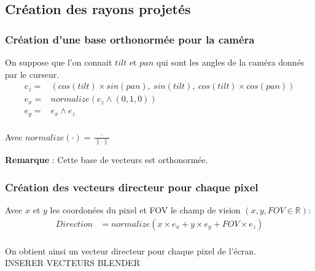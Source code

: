 \subsection{Création des rayons projetés}
\subsubsection{Création d'une base orthonormée pour la caméra}

On suppose que l'on connait $tilt$ et $pan$ qui sont les angles de la caméra donnés par le curseur. 
\begin{align*}
    e_z =&  (cos(tilt)\times sin(pan) ,\ sin(tilt) ,\ cos(tilt)\times cos(pan))\\
    e_x =&  normalize(e_z \wedge (0,1,0) )\\
    e_y =& e_x \wedge e_z\\
\end{align*}

Avec $normalize(\cdot ) = \frac{\cdot }{\| \cdot  \|}$

\textbf{Remarque} : Cette base de vecteurs est orthonormée.
\subsubsection{Création des vecteurs directeur pour chaque pixel}
Avec $x$ et $y$ les coordonées du pixel et FOV le champ de vision $(x,y,FOV\in \mathbb{R})$: 
\begin{align*}
    Direction &= normalize(x\times e_x + y\times e_y + FOV\times e_z)\\
\end{align*}

On obtient ainsi un vecteur directeur pour chaque pixel de l'écran.
\\INSERER VECTEURS BLENDER